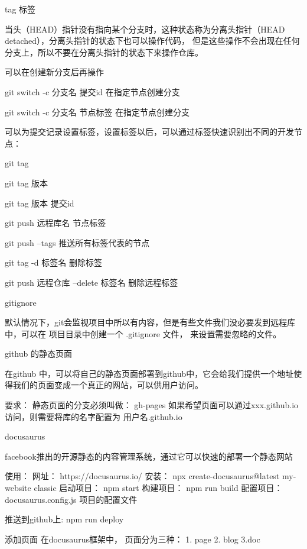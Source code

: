         tag  标签

        当头（HEAD）指针没有指向某个分支时，这种状态称为分离头指针（HEAD detached），分离头指针的状态下也可以操作代码，
        但是这些操作不会出现在任何分支上，所以不要在分离头指针的状态下来操作仓库。

        可以在创建新分支后再操作

        git switch -c 分支名  提交id   在指定节点创建分支

        git switch -c 分支名  节点标签  在指定节点创建分支

        可以为提交记录设置标签，设置标签以后，可以通过标签快速识别出不同的开发节点：

        git tag

        git tag 版本

        git tag 版本 提交id

        git push 远程库名 节点标签

        git push --tags     推送所有标签代表的节点

        git tag -d 标签名   删除标签

        git push 远程仓库 --delete 标签名   删除远程标签

        gitignore

        默认情况下，git会监视项目中所以有内容，但是有些文件我们没必要发到远程库中，可以在
        项目目录中创建一个  .gitignore 文件， 来设置需要忽略的文件。

        github 的静态页面

        在github 中，可以将自己的静态页面部署到github中，它会给我们提供一个地址使得我们的页面变成一个真正的网站，可以供用户访问。
        
        要求：
            静态页面的分支必须叫做： gh-pages
            如果希望页面可以通过xxx.github.io 访问，则需要将库的名字配置为  用户名.github.io

        
        docusaurus

        facebook推出的开源静态的内容管理系统，通过它可以快速的部署一个静态网站

        使用：
            网址：
                https://docusaurus.io/
            安装：
                npx create-docusaurus@latest my-website classic
            启动项目：
                npm start 
            构建项目：
                npm run build
            配置项目：
                docusaurus.config.js    项目的配置文件

            推送到github上:
                npm run deploy

            添加页面
                在docusaurus框架中， 页面分为三种： 1. page 2. blog   3.doc
            
        




            